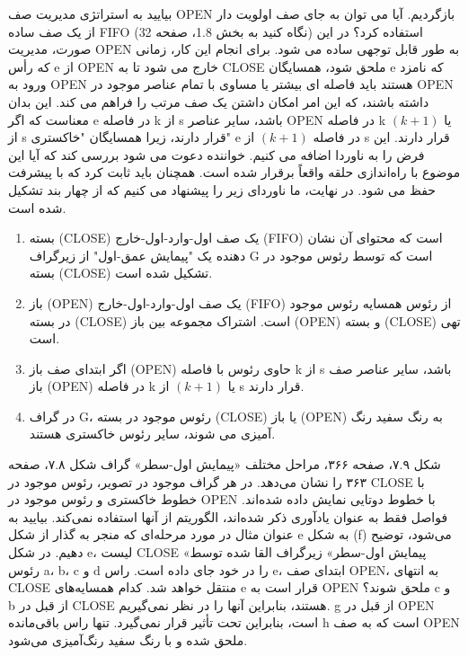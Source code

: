 \documentclass{book} %
\begin{document}
بیایید به استراتژی مدیریت صف OPEN بازگردیم. آیا می توان به جای صف اولویت دار از یک صف ساده FIFO (نگاه کنید به بخش 1.8، صفحه 32) استفاده کرد؟ در این صورت، مدیریت OPEN به طور قابل توجهی ساده می شود. برای انجام این کار، زمانی که رأس e از OPEN خارج می شود تا به CLOSE ملحق شود، همسایگان e که نامزد ورود به OPEN هستند باید فاصله ای بیشتر یا مساوی با تمام عناصر موجود در OPEN داشته باشند، که این امر امکان داشتن یک صف مرتب را فراهم می کند. این بدان معناست که اگر e در فاصله k از s باشد، سایر عناصر OPEN در فاصله k یا $(k + 1)$ از s قرار دارند، زیرا همسایگان "خاکستری" e در فاصله $(k + 1)$ از s قرار دارند. این فرض را به ناوردا اضافه می کنیم. خواننده دعوت می شود بررسی کند که آیا این موضوع با راه‌اندازی حلقه واقعاً برقرار شده است. همچنان باید ثابت کرد که با پیشرفت حفظ می شود. در نهایت، ما ناوردای زیر را پیشنهاد می کنیم که از چهار بند تشکیل شده است.

\begin{enumerate}
    \item  بسته (CLOSE) یک صف اول-وارد-اول-خارج (FIFO) است که محتوای آن نشان دهنده یک "پیمایش عمق-اول" از زیرگراف G است که توسط رئوس موجود در بسته (CLOSE) تشکیل شده است.
    
    \item  باز (OPEN) یک صف اول-وارد-اول-خارج (FIFO) از رئوس همسایه رئوس موجود در بسته (CLOSE) است. اشتراک مجموعه بین باز (OPEN) و بسته (CLOSE) تهی است.

    \item اگر ابتدای صف باز (OPEN) حاوی رئوس با فاصله k از s باشد، سایر عناصر صف باز (OPEN) در فاصله k یا $(k + 1)$ از s قرار دارند.

    \item در گراف G، رئوس موجود در بسته (CLOSE) یا باز (OPEN) به رنگ سفید رنگ آمیزی می شوند، سایر رئوس خاکستری هستند.
\end{enumerate}
\newpage

شکل ۷.۹، صفحه ۳۶۶، مراحل مختلف «پیمایش اول-سطر» گراف شکل ۷.۸، صفحه ۳۶۳ را نشان می‌دهد. در هر گراف موجود در تصویر، رئوس موجود در CLOSE با خطوط خاکستری و رئوس موجود در OPEN با خطوط دوتایی نمایش داده شده‌اند. فواصل فقط به عنوان یادآوری ذکر شده‌اند، الگوریتم از آنها استفاده نمی‌کند. بیایید به عنوان مثال در مورد مرحله‌ای که منجر به گذار از شکل e به شکل (f) می‌شود، توضیح دهیم. در شکل e، لیست CLOSE «پیمایش اول-سطر» زیرگراف القا شده توسط رئوس a، b، c و d را در خود جای داده است. راس e، ابتدای صف OPEN، به انتهای CLOSE منتقل خواهد شد. کدام همسایه‌های e قرار است به OPEN ملحق شوند؟ c و b از قبل در CLOSE هستند، بنابراین آنها را در نظر نمی‌گیریم. g از قبل در OPEN است، بنابراین تحت تأثیر قرار نمی‌گیرد. تنها راس باقی‌مانده h است که به صف OPEN ملحق شده و با رنگ سفید رنگ‌آمیزی می‌شود.
\end{document}
